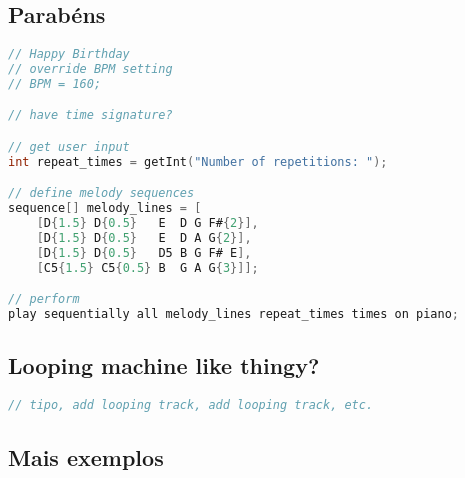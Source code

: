 \documentclass{article}
\begin{document}
\subsection{Parabéns}
\begin{lstlisting}[language=C]
// Happy Birthday
// override BPM setting
// BPM = 160;

// have time signature?

// get user input
int repeat_times = getInt("Number of repetitions: ");

// define melody sequences
sequence[] melody_lines = [
    [D{1.5} D{0.5}   E  D G F#{2}], 
    [D{1.5} D{0.5}   E  D A G{2}],
    [D{1.5} D{0.5}   D5 B G F# E],
    [C5{1.5} C5{0.5} B  G A G{3}]];

// perform
play sequentially all melody_lines repeat_times times on piano;
\end{lstlisting}

\subsection{Looping machine like thingy?}
\begin{lstlisting}[language=C]
// tipo, add looping track, add looping track, etc.
\end{lstlisting}

\subsection{Mais exemplos}
\begin{lstlisting}[language=C]
\end{lstlisting}

% 
% 
\end{document}
